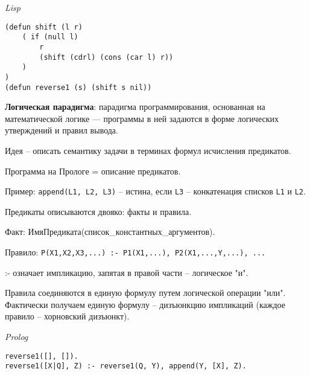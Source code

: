 \textit{Lisp}

\begin{lstlisting}[basicstyle=\ttfamily\small, frame=single]
(defun shift (l r)
    ( if (null l)
        r
        (shift (cdrl) (cons (car l) r))
    )
)
(defun reverse1 (s) (shift s nil))
    \end{lstlisting}

\bigbreak
\textbf{Логическая парадигма}:  парадигма программирования, основанная на математической логике — программы в ней задаются в форме логических утверждений и правил вывода.

Идея -- описать семантику задачи в терминах формул исчисления предикатов.

Программа на Прологе = описание предикатов.

Пример: \texttt{append(L1, L2, L3)} -- истина, если \texttt{L3} -- конкатенация списков \texttt{L1} и \texttt{L2}.

Предикаты описываются двояко: факты и правила.

Факт: ИмяПредиката(список\_константных\_аргументов).

Правило: \texttt{P(X1,X2,X3,...) :- P1(X1,...), P2(X1,...,Y,...), ...}

:- означает импликацию, запятая в правой части -- логическое "и".

Правила соединяются в единую формулу путем логической операции "или". Фактически получаем единую формулу -- дизъюнкцию импликаций (каждое правило -- хорновский дизъюнкт).

\textit{Prolog}

\begin{lstlisting}[basicstyle=\ttfamily\small, frame=single]
reverse1([], []).
reverse1([X|Q], Z) :- reverse1(Q, Y), append(Y, [X], Z).
    \end{lstlisting}


